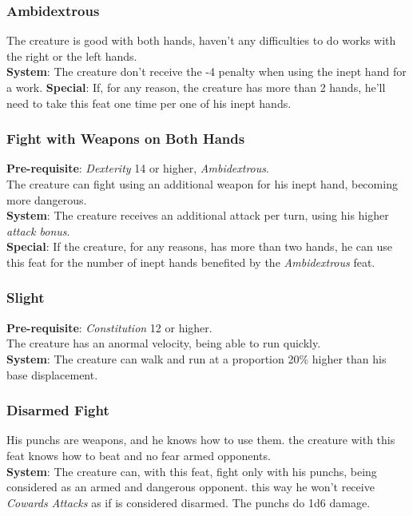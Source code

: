 \documentclass[ letterpaper,12pt]{article}
\begin{document}
\subsubsection{Ambidextrous}
The creature is good with both hands, haven't any difficulties to do works with the right or the left hands.\\
{\bf System}: The creature don't receive the -4 penalty when using the inept hand for a work.
{\bf Special}: If, for any reason, the creature has more than 2 hands, he'll need to take this feat one time per one of his inept hands.\\

\subsubsection{Fight with Weapons on Both Hands}
{\bf Pre-requisite}: {\it Dexterity} 14 or higher, {\it Ambidextrous}.\\
The creature can fight using an additional weapon for his inept hand, becoming more dangerous.\\
{\bf System}: The creature receives an additional attack per turn, using his higher {\it attack bonus}.\\
{\bf Special}: If the creature, for any reasons, has more than two hands, he can use this feat for the number of inept hands benefited by the {\it Ambidextrous} feat.

\subsubsection{Slight}
{\bf Pre-requisite}: {\it Constitution} 12 or higher.\\
The creature has an anormal velocity, being able to run quickly.\\
{\bf System}: The creature can walk and run at a proportion 20\% higher than his base displacement.

\subsubsection{Disarmed Fight}
His punchs are weapons, and he knows how to use them. the creature with this feat knows how to beat and no fear armed opponents.\\
{\bf System}: The creature can, with this feat, fight only with his punchs, being considered as an armed and dangerous opponent. this way he won't receive {\it Cowards Attacks} as if is considered disarmed. The punchs do 1d6 damage.
\end{document}
